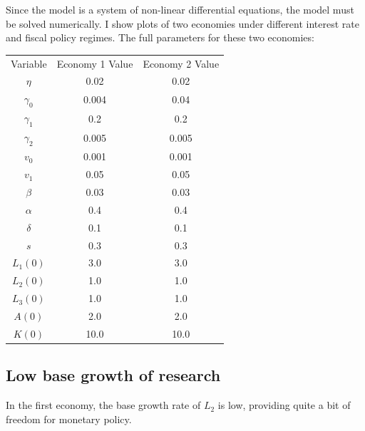 \documentclass[12pt]{article}
\theoremstyle{definition}
\begin{document}
Since the model is a system of non-linear differential equations, the model must be solved numerically.  I show plots of two economies under different interest rate and fiscal policy regimes.  The full parameters for these two economies:

\begin{center}
\begin{tabular}{ c c c }
      Variable  & Economy 1 Value & Economy 2 Value \\ 
      \(\eta\) & 0.02 & 0.02 \\  
      \(\gamma_0\) & 0.004 & 0.04  \\  
      \(\gamma_1\) & 0.2 & 0.2  \\  
      \(\gamma_2\) & 0.005 & 0.005  \\ 
      \(v_0\) & 0.001 & 0.001  \\  
      \(v_1\) & 0.05 & 0.05  \\  
      \(\beta\) & 0.03 & 0.03  \\  
      \(\alpha\) & 0.4 & 0.4  \\  
      \(\delta\) & 0.1 & 0.1  \\  
      \(s\) & 0.3 & 0.3  \\ 
      \(L_1(0)\) & 3.0 & 3.0  \\ 
      \(L_2(0)\) & 1.0 & 1.0  \\ 
      \(L_3(0)\) & 1.0 & 1.0  \\ 
      \(A(0)\) & 2.0 & 2.0  \\ 
      \(K(0)\) & 10.0 & 10.0  
\end{tabular}
\end{center}

\subsection{Low base growth of research}

In the first economy, the base growth rate of \(L_2\) is low, providing quite a bit of freedom for monetary policy.  
\end{document}
